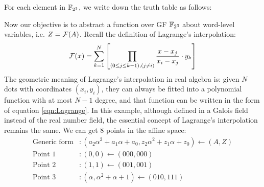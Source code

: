 \begin{Example}
For each element in $\F_{2^3}$, we write down the truth table as follows:
\begin{table}[H]
\label{tab:truthtable}
\caption{Truth table for mappings in $\mathbb{B}^3$ and $\F_{2^3}$}
\end{table}
Now our objective is to abstract a function over GF $\F_{2^3}$ about word-level variables, i.e. $Z = {\mathcal{F}}(A)$.
Recall the definition of Lagrange's interpolation:
\begin{equation}
\label{eqn:Lagrange}
{\mathcal{F}}(x) =  \sum_{k=1}^N \left[ \prod_{(0\leq j \leq k-1),(j\neq i)}\frac{x-x_j}{x_i-x_j} \cdot y_k \right]
\end{equation}
The geometric meaning of Lagrange's interpolation in real algebra is: given $N$ dots with coordinates $(x_i,y_i)$,
they can always be fitted into a polynomial function with at most $N-1$ degree, and that function can be 
written in the form of equation \ref{eqn:Lagrange}. In this example, although defined in a Galois field instead of 
the real number field, the essential concept of Lagrange's interpolation remains the same. 
We can get 8 points in the affine space:
\begin{align*}
\text{Generic form}&: (a_2\alpha^2+a_1\alpha+a_0,z_2\alpha^2+z_1\alpha+z_0) \gets (A,Z) \\
\text{Point }1&: (0, 0) \gets (000,000) \\
\text{Point }2&: (1,1) \gets (001,001) \\
\text{Point }3&:  (\alpha,\alpha^2 + \alpha + 1) \gets (010,111)\\

\end{align*}
\end{Example}
